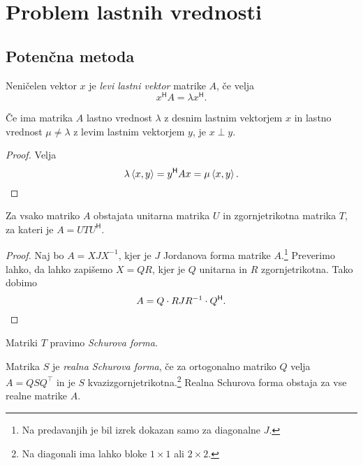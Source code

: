 \section{Problem lastnih vrednosti}

\subsection{Potenčna metoda}

\begin{definicija}
Neničelen vektor $x$ je
\emph{levi lastni vektor} matrike $A$, če
velja
\[
x^\mathsf{H} A = \lambda x^\mathsf{H}.
\]
\end{definicija}

\begin{lema}
Če ima matrika $A$ lastno vrednost $\lambda$ z desnim lastnim
vektorjem $x$ in lastno vrednost $\mu \ne \lambda$ z levim lastnim
vektorjem $y$, je $x \perp y$.
\end{lema}

\begin{proof}
Velja
\[
\lambda \left\langle x,y\right\rangle = y^\mathsf{H} Ax = \mu \left\langle x,y\right\rangle. \qedhere
\]
\end{proof}

\begin{izrek}[Schur]
Za vsako matriko $A$ obstajata unitarna matrika $U$ in
zgornjetrikotna matrika $T$, za kateri je $A = UTU^\mathsf{H}$.
\end{izrek}

\begin{proof}
Naj bo $A = XJX^{-1}$, kjer je $J$ Jordanova forma matrike
$A$.\footnote{Na predavanjih je bil izrek dokazan samo za
diagonalne $J$.} Preverimo lahko, da lahko zapišemo $X = QR$, kjer
je $Q$ unitarna in $R$ zgornjetrikotna. Tako dobimo
\[
A = Q \cdot RJR^{-1} \cdot Q^\mathsf{H}. \qedhere
\]
\end{proof}

\begin{opomba}
Matriki $T$ pravimo \emph{Schurova forma}.
\end{opomba}

\begin{opomba}
Matrika $S$ je \emph{realna Schurova forma}, če za ortogonalno
matriko $Q$ velja $A = Q S Q^\top$ in je $S$
kvazizgornjetrikotna.\footnote{Na diagonali ima lahko bloke
$1 \times 1$ ali $2 \times 2$.} Realna Schurova forma obstaja za
vse realne matrike $A$.
\end{opomba}

